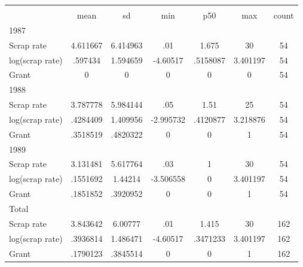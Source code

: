 \begin{tabular}{l*{1}{cccccc}}
\hline\hline
                    &\multicolumn{6}{c}{}                                                         \\
                    &        mean&          sd&         min&         p50&         max&       count\\
\hline
1987                &            &            &            &            &            &            \\
Scrap rate          &    4.611667&    6.414963&         .01&       1.675&          30&          54\\
log(scrap rate)     &     .597434&    1.594659&    -4.60517&    .5158087&    3.401197&          54\\
Grant               &           0&           0&           0&           0&           0&          54\\
\hline
1988                &            &            &            &            &            &            \\
Scrap rate          &    3.787778&    5.984144&         .05&        1.51&          25&          54\\
log(scrap rate)     &    .4284409&    1.409956&   -2.995732&    .4120877&    3.218876&          54\\
Grant               &    .3518519&    .4820322&           0&           0&           1&          54\\
\hline
1989                &            &            &            &            &            &            \\
Scrap rate          &    3.131481&    5.617764&         .03&           1&          30&          54\\
log(scrap rate)     &    .1551692&     1.44214&   -3.506558&           0&    3.401197&          54\\
Grant               &    .1851852&    .3920952&           0&           0&           1&          54\\
\hline
Total               &            &            &            &            &            &            \\
Scrap rate          &    3.843642&     6.00777&         .01&       1.415&          30&         162\\
log(scrap rate)     &    .3936814&    1.486471&    -4.60517&    .3471233&    3.401197&         162\\
Grant               &    .1790123&    .3845514&           0&           0&           1&         162\\
\hline\end{tabular}
